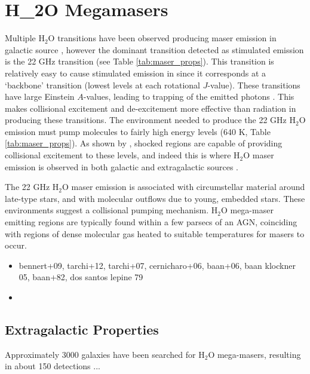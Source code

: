 \section{H_2O Megamasers}
\label{sec:h2o_mm}

Multiple H$_2$O transitions have been observed producing maser emission in galactic source \citep{Elitzur_1992}, however the dominant transition detected as stimulated emission is the 22 GHz transition (see Table \ref{tab:maser_props}). This transition is relatively easy to cause stimulated emission in since it corresponds at a `backbone' transition (lowest levels at each rotational $J$-value). These transitions have large Einstein $A$-values, leading to trapping of the emitted photons \citep{stahler_palla_2004}. This makes collisional excitement and de-excitement more effective than radiation in producing these transitions. The environment needed to produce the 22 GHz H$_2$O emission must pump molecules to fairly high energy levels (640 K, Table \ref{tab:maser_props}). As shown by \citet{stahler_palla_2004}, shocked regions are capable of providing collisional excitement to these levels, and indeed this is where H$_2$O maser emission is observed in both galactic and extragalactic sources \citep{Elitzur_1992, lo2005}. 

The 22 GHz H$_2$O maser emission is associated with circumstellar material around late-type stars, and with molecular outflows due to young, embedded stars. These environments suggest a collisional pumping mechanism. H$_2$O mega-maser emitting regions are typically found within a few parsecs of an AGN, coinciding with regions of dense molecular gas heated to suitable temperatures for masers to occur. 

\begin{itemize}
\item bennert+09, tarchi+12, tarchi+07, cernicharo+06, baan+06, baan klockner 05, baan+82, dos santos lepine 79
\item 
\end{itemize}

\subsection{Extragalactic Properties}
\label{sub:h2o_props}

Approximately 3000 galaxies have been searched for H$_2$O mega-masers, resulting in about 150 detections \citet{tarchi2012}...

